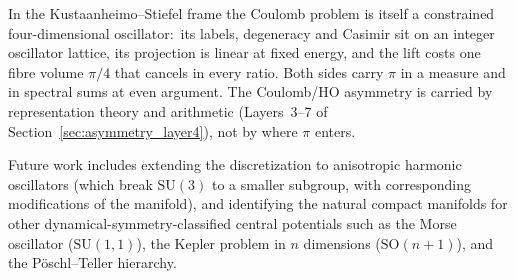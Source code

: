 \documentclass[twocolumn,pra,amsmath,amssymb,superscriptaddress]{revtex4-2}
\begin{document}
In the Kustaanheimo--Stiefel frame the Coulomb problem is itself a
constrained four-dimensional oscillator:\ its labels, degeneracy and
Casimir sit on an integer oscillator lattice, its projection is linear
at fixed energy, and the lift costs one fibre volume $\pi/4$ that
cancels in every ratio.  Both sides carry $\pi$ in a measure and in
spectral sums at even argument.  The Coulomb/HO asymmetry is carried by
representation theory and arithmetic (Layers~3--7 of
Section~\ref{sec:asymmetry_layer4}), not by where $\pi$ enters.

Future work includes extending the discretization to anisotropic
harmonic oscillators (which break $\mathrm{SU}(3)$ to a smaller
subgroup, with corresponding modifications of the manifold), and
identifying the natural compact manifolds for other
dynamical-symmetry-classified central potentials such as the
Morse oscillator ($\mathrm{SU}(1, 1)$), the Kepler problem in
$n$ dimensions ($\mathrm{SO}(n + 1)$), and the P\"oschl--Teller
hierarchy.
\end{document}
